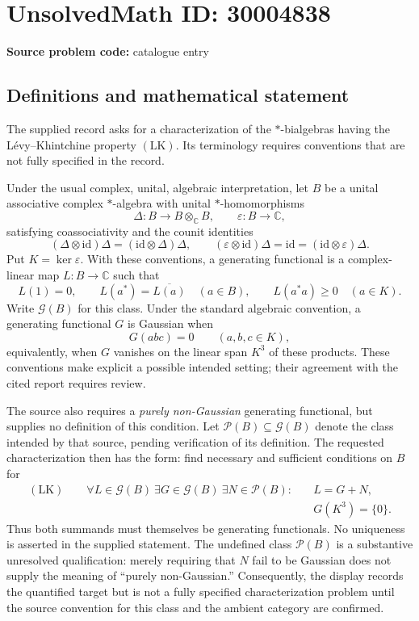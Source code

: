 \documentclass[11pt]{article}
\newcommand{\C}{\mathbb{C}}
\begin{document}
\section*{UnsolvedMath ID: 30004838}
\textbf{Source problem code:} catalogue entry
\subsection{Definitions and mathematical statement}
The supplied record asks for a characterization of the \(*\)-bialgebras having the L\'evy--Khintchine property \((\mathrm{LK})\). Its terminology requires conventions that are not fully specified in the record.

Under the usual complex, unital, algebraic interpretation, let \(B\) be a unital associative complex \(*\)-algebra with unital \(*\)-homomorphisms
\[
\Delta:B\longrightarrow B\otimes_{\C}B,
\qquad \varepsilon:B\longrightarrow\C,
\]
satisfying coassociativity and the counit identities
\[
(\Delta\otimes\mathrm{id})\Delta=(\mathrm{id}\otimes\Delta)\Delta,
\qquad
(\varepsilon\otimes\mathrm{id})\Delta=\mathrm{id}
=(\mathrm{id}\otimes\varepsilon)\Delta.
\]
Put \(K=\ker\varepsilon\). With these conventions, a generating functional is a complex-linear map \(L:B\to\C\) such that
\[
L(1)=0,\qquad L(a^*)=\overline{L(a)}\quad(a\in B),\qquad
L(a^*a)\geq0\quad(a\in K).
\]
Write \(\mathcal G(B)\) for this class. Under the standard algebraic convention, a generating functional \(G\) is Gaussian when
\[
G(abc)=0\qquad(a,b,c\in K),
\]
equivalently, when \(G\) vanishes on the linear span \(K^3\) of these products. These conventions make explicit a possible intended setting; their agreement with the cited report requires review.

The source also requires a \emph{purely non-Gaussian} generating functional, but supplies no definition of this condition. Let \(\mathcal P(B)\subseteq\mathcal G(B)\) denote the class intended by that source, pending verification of its definition. The requested characterization then has the form: find necessary and sufficient conditions on \(B\) for
\[
\begin{split}
(\mathrm{LK})\qquad
\forall L\in\mathcal G(B)\ \exists G\in\mathcal G(B)\ \exists N\in\mathcal P(B):\quad
&L=G+N,\\
&G(K^3)=\{0\}.
\end{split}
\]
Thus both summands must themselves be generating functionals. No uniqueness is asserted in the supplied statement. The undefined class \(\mathcal P(B)\) is a substantive unresolved qualification: merely requiring that \(N\) fail to be Gaussian does not supply the meaning of ``purely non-Gaussian.'' Consequently, the display records the quantified target but is not a fully specified characterization problem until the source convention for this class and the ambient category are confirmed.
\end{document}

